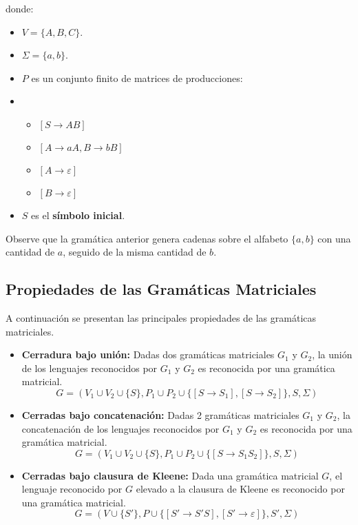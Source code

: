 \documentclass[12pt]{article}
\begin{document}
donde:
\begin{itemize}
    \item \( V = \{A,B,C\} \).
    \item \( \Sigma=\{a,b\} \).
    \item \( P \) es un conjunto finito de matrices de producciones:
    \item \begin{itemize}
              \item \([S\to AB]\)
              \item \([A\to aA, B\to bB]\)
              \item \([A\to \varepsilon]\)
              \item \([B\to \varepsilon]\)
          \end{itemize}
    \item \( S  \) es el \textbf{símbolo inicial}.
\end{itemize}

Observe que la gramática anterior genera cadenas sobre el alfabeto $\{a,b\}$ con una cantidad de $a$, seguido
de la misma cantidad de $b$.

\subsection{Propiedades de las Gramáticas Matriciales}

A continuación se presentan las principales propiedades de las gramáticas matriciales.

\begin{itemize}
    \item \textbf{Cerradura bajo unión:} Dadas dos gramáticas matriciales $G_1$ y $G_2$,
          la unión de los lenguajes reconocidos por $G_1$ y $G_2$ es reconocida por una gramática matricial.
          $$G=(V_1\cup V_2\cup\{S\} , P_1\cup P_2\cup\{[S\to S_1],[S\to S_2]\}, S,\Sigma)$$
    \item \textbf{Cerradas bajo concatenación:} Dadas 2 gramáticas matriciales $G_1$ y $G_2$, la concatenación de
          los lenguajes reconocidos por $G_1$ y $G_2$ es reconocida por una gramática matricial.
          $$G=(V_1\cup V_2\cup\{S\} , P_1\cup P_2\cup\{[S\to S_1 S_2]\}, S,\Sigma)$$
    \item \textbf{Cerradas bajo clausura de Kleene:} Dada una gramática matricial $G$, el lenguaje reconocido por
          $G$ elevado a la clausura de Kleene es reconocido por una gramática matricial.
          $$G=(V\cup\{S'\} , P\cup\{[S'\to S'S],[S'\to \varepsilon]\}, S',\Sigma)$$
\end{itemize}
\end{document}
